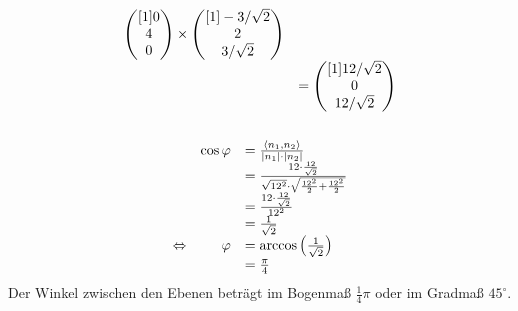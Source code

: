 \documentclass[main.tex]{subfiles}
\begin{document}
\begin{gather*}
\begin{array}{ c l }
\begin{pmatrix}[1]
        0\\
        4\\
        0
        \end{pmatrix} \times \begin{pmatrix}[1]
        -3/\sqrt{2}\\
        2\\
        3/\sqrt{2}
        \end{pmatrix}\\
        & =\begin{pmatrix}[1]
        12/\sqrt{2}\\
        0\\
        12/\sqrt{2}
        \end{pmatrix}
    \end{array}\\
    \\
    \begin{array}{ c r l }
    & \cos \varphi  & =\frac{\langle n_{1} ,n_{2}\rangle }{| n_{1}| \cdotp | n_{2}| }\\
    &  & =\frac{12\cdotp \frac{12}{\sqrt{2}}}{\sqrt{12^{2}} \cdotp \sqrt{\frac{12^{2}}{2} +\frac{12^{2}}{2}}}\\
    &  & =\frac{12\cdotp \frac{12}{\sqrt{2}}}{12^{2}}\\
    &  & =\frac{1}{\sqrt{2}}\\
    \Leftrightarrow  & \varphi  & =\arccos\left(\frac{1}{\sqrt{2}}\right)\\
    &  & =\frac{\pi }{4}
    \end{array}
\end{gather*}
Der Winkel zwischen den Ebenen beträgt im Bogenmaß $\frac{1}{4} \pi $ oder im Gradmaß $45^{\circ}$.
\end{document}
